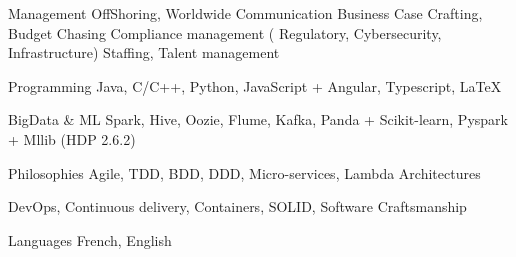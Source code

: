 


\begin{cvskills}

\cvskill
{\scriptsize Management} %
{\scriptsize {\enskip\cdotp\enskip}OffShoring, Worldwide Communication}
\cvskill
{} 
{\scriptsize {\enskip\cdotp\enskip}Business Case Crafting, Budget Chasing }
\cvskill
{} 
{\scriptsize {\enskip\cdotp\enskip}Compliance management ( Regulatory, Cybersecurity, Infrastructure) } %
\cvskill
{} 
{\scriptsize {\enskip\cdotp\enskip}Staffing, Talent management } %

\cvskill
{\scriptsize Programming} %
{\scriptsize Java, C/C++, Python, JavaScript + Angular, Typescript, LaTeX} %

\cvskill
{\scriptsize BigData \& ML} %
{\scriptsize Spark, Hive, Oozie, Flume, Kafka, Panda + Scikit-learn, Pyspark + Mllib (HDP 2.6.2) } %

\cvskill
{\scriptsize Philosophies} %
{\scriptsize Agile, TDD, BDD, DDD, Micro-services, Lambda Architectures} %

\cvskill
{} %
{\scriptsize DevOps, Continuous delivery, Containers, SOLID, Software Craftsmanship} %


\cvskill
{\scriptsize Languages} %
{\scriptsize French, English} %

\end{cvskills}